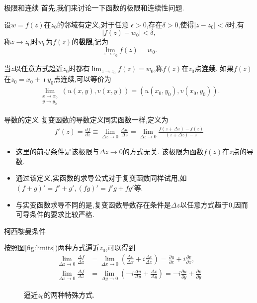 \documentclass[fontset=windows, chinese, 10pt]{beamer}
\begin{document}
\begin{frame}{极限和连续}
  首先,我们来讨论一下函数的极限和连续性问题.
  \begin{definition}
      设$w=f(z)$在$z_0$的邻域有定义,对于任意
  $\epsilon > 0$,存在$\delta > 0$,使得$|z-z_0| < \delta$时,有
  \begin{equation}
      |f(z) - w_0| < \delta ,
  \end{equation}
  称$z\to z_0$时$w_0$为$f(z)$的{\bf 极限},记为
  \begin{equation}
      \lim_{z\to z_0} f(z) = w_0 .
  \end{equation}
  \end{definition}
  当$z$以任意方式趋近$z_0$时都有$ \lim_{z\to z_0} f(z) = w_0$,称$f(z)$在$z_0$点{\bf 连续}.
  如果$f(z)$ 在$z_0=x_0 + \imath y_0$点连续,可以等价为
  \begin{align}
      \lim_{\substack{x\to x_0\\y\to y_0}} \left(u(x,y), v(x,y)\right) = \left(u(x_0, y_0), v(x_0, y_0)\right) . 
  \end{align}
\end{frame}


\begin{frame}{导数的定义}
  复变函数的导数定义同实函数一样,定义为
  \begin{align}
      \label{eq:derivative_def}
      f'(z) = \frac{df}{dz} 
      \equiv\lim_{\Delta z \to 0} \frac{\Delta w} {\Delta z} 
      = \lim_{\Delta z\to 0} \frac{f(z+\Delta z) - f(z) } {(z+\Delta z ) - z}
  \end{align}
  \begin{itemize}
    \item   这里的前提条件是该极限与$\Delta z \to 0$的方式无关.  该极限为函数$f(z)$在$z$点的导数.
    \item  通过该定义,实函数的求导公式对于复变函数同样试用,如
    $(f+g)' = f' + g', (fg)' =f'g + fg'$等. 
    \item   与实变函数求导不同的是,复变函数导数存在条件是$\Delta z$以任意方式趋于$0$,因而可导条件的要求比较严格.
  \end{itemize}

\end{frame}

\begin{frame}{柯西黎曼条件}


按照图\eqref{fig:limits})两种方式逼近$z_0$,可以得到
\begin{align}
    \lim _{\Delta z \rightarrow 0} \frac{\Delta f}{\Delta z} &=\lim _{\Delta x \rightarrow 0}\left(\frac{\Delta u}{\Delta x}+i \frac{\Delta v}{\Delta x}\right)=\frac{\partial u}{\partial x}+i \frac{\partial v}{\partial x},
\\
    \lim _{\Delta z \rightarrow 0} \frac{\Delta f}{\Delta z} &=\lim _{\Delta y \rightarrow 0}\left(-i \frac{\Delta u}{\Delta y}+\frac{\Delta v}{\Delta y}\right)=-i \frac{\partial u}{\partial y}+\frac{\partial v}{\partial y}
\end{align}
\begin{figure}
  \centering
  
  \caption{逼近$z_0$的两种特殊方式.}
  \label{fig:limits}
\end{figure}
\end{frame}
\end{document}

